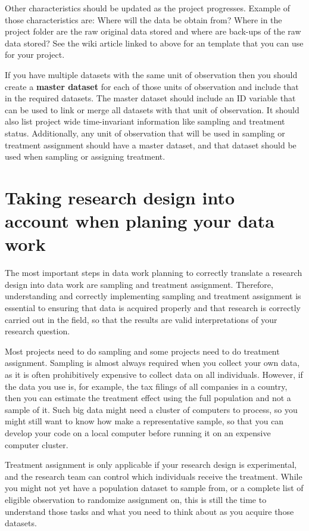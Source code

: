Other characteristics should be updated as the project progresses.
Example of those characteristics are:
Where will the data be obtain from?
Where in the project folder are the raw original data stored
and where are back-ups of the raw data stored?
See the wiki article linked to above for an template that you can use for your project.

If you have multiple datasets with the same unit of observation
then you should create a \textbf{master dataset}
for each of those units of observation and include that in the required datasets.
The master dataset should include an ID variable
that can be used to link or merge all datasets with that unit of observation.
It should also list project wide time-invariant information
like sampling and treatment status.
Additionally, any unit of observation
that will be used in sampling or treatment assignment
should have a master dataset,
and that dataset should be used when sampling or assigning treatment.

\section{Taking research design into account when planing your data work}

The most important steps in data work planning
to correctly translate a research design into data work
are sampling and treatment assignment.
Therefore, understanding and correctly implementing sampling and treatment assignment
is essential to ensuring that data is acquired properly and that research
is correctly carried out in the field, so that the results
are valid interpretations of your research question.

Most projects need to do sampling and some projects need to do treatment assignment.
Sampling is almost always required when you collect your own data,
as it is often prohibitively expensive to collect data on all individuals.
However, if the data you use is, for example,
the tax filings of all companies in a country,
then you can estimate the treatment effect
using the full population and not a sample of it.
Such big data might need a cluster of computers to process,
so you might still want to know how make a representative sample,
so that you can develop your code on a local computer
before running it on an expensive computer cluster.

Treatment assignment is only applicable if your research design is experimental,
and the research team can control which individuals receive the treatment.
While you might not yet have a population dataset to sample from,
or a complete list of eligible observation to randomize assignment on,
this is still the time to understand those tasks
and what you need to think about as you acquire those datasets.

